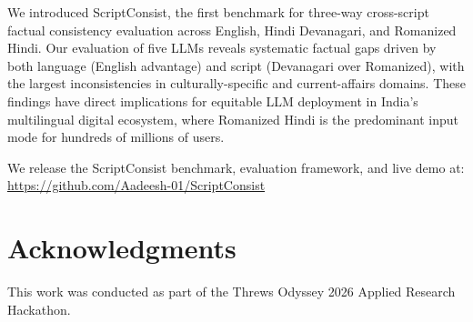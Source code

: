 \documentclass[11pt,a4paper]{article}
\begin{document}
We introduced ScriptConsist, the first benchmark for three-way cross-script factual consistency evaluation across English, Hindi Devanagari, and Romanized Hindi. Our evaluation of five LLMs reveals systematic factual gaps driven by both language (English advantage) and script (Devanagari over Romanized), with the largest inconsistencies in culturally-specific and current-affairs domains. These findings have direct implications for equitable LLM deployment in India's multilingual digital ecosystem, where Romanized Hindi is the predominant input mode for hundreds of millions of users.

We release the ScriptConsist benchmark, evaluation framework, and live demo at: \url{https://github.com/Aadeesh-01/ScriptConsist}

\section*{Acknowledgments}
This work was conducted as part of the Threws Odyssey 2026 Applied Research Hackathon.


\end{document}
